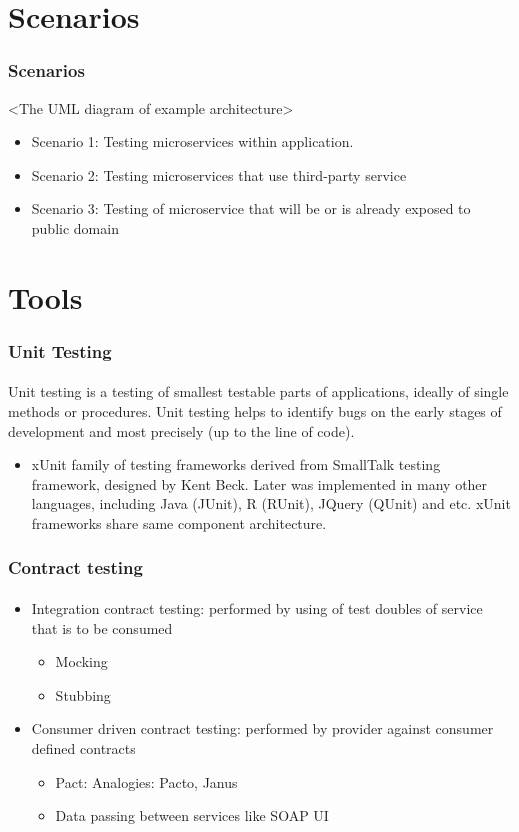 \documentclass{beamer}
\begin{document}
\section{Scenarios}
\begin{frame}
	\frametitle{Scenarios}
	<The UML diagram of example architecture>
	\begin{itemize}
 		 \item Scenario 1: Testing microservices within application. \\
			 
		 \item Scenario 2: Testing microservices that use third-party service
		 \item Scenario 3: Testing of microservice that will be or is already exposed to public domain
	\end{itemize}
\end{frame}


\section{Tools}

\begin{frame}
	\frametitle{Unit Testing}
	\framesubtitle{}
	Unit testing is a testing of smallest testable parts of applications, ideally of single methods or procedures. Unit testing helps to identify bugs on the early stages of development and most precisely (up to the line of code).  
	\begin{itemize}
 		 \item xUnit family of testing frameworks derived from SmallTalk testing framework, designed by Kent Beck. Later was implemented in many other languages, including Java (JUnit), R (RUnit), JQuery (QUnit) and etc. xUnit frameworks share same component architecture.
	\end{itemize}
\end{frame}

\begin{frame}
	\frametitle{Contract testing}
	\framesubtitle{}

	\begin{itemize}
 		\item Integration contract testing: performed by using of test doubles of service that is to be consumed
			\begin{itemize}
				\item Mocking 
				\item Stubbing
			\end{itemize}
		\item Consumer driven contract testing: performed by provider against consumer defined contracts
			\begin{itemize}
				\item Pact: Analogies: Pacto, Janus
				\item Data passing between services like SOAP UI
			\end{itemize}
	\end{itemize}
\end{frame}
\end{document}

